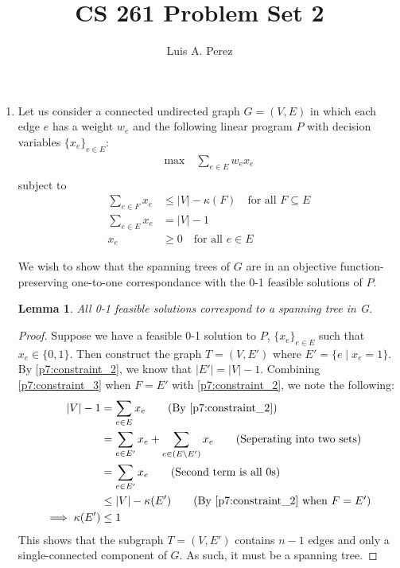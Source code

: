 \documentclass[12pt]{exam}
\newtheorem{lemma}[theorem]{Lemma}
\newcommand*{\authorname}{Luis A. Perez}
\newcommand{\Q}[1]{\question{\large{\textbf{#1}}}}
\begin{document}
\title{CS 261 Problem Set 2}
\author{\authorname}
\date{}
\maketitle
\thispagestyle{headandfoot}
\setcounter{MaxMatrixCols}{15}

\begin{questions}
\Q{Problem 7}
\begin{solution}
  \begin{enumerate}[label=(\alph*)]
    \item
      Let us consider a connected undirected graph $G= (V,E)$ in which each edge $e$ has a weight $w_e$ and the following linear program $P$ with decision variables $\{ x_e \}_{e \in E}$:
        \begin{align}
          \text{max} \quad \sum_{e \in E} w_e x_e \label{p7:obj} \\
        \end{align}
        subject to
        \begin{align}
          \sum_{e \in F} x_e &\leq |V| - \kappa(F) \quad \text{for all } F \subseteq E \label{p7:constraint_1} \\
          \sum_{e \in E} x_e &= |V| -1 \label{p7:constraint_2} \\
          x_e &\geq 0 \quad \text{for all } e \in E \label{p7:constraint_3}
        \end{align}


      We wish to show that the spanning trees of $G$ are in an objective function-preserving one-to-one correspondance with the 0-1 feasible solutions of $P$.

      \begin{lemma}
      All 0-1 feasible solutions correspond to a spanning tree in G.
      \end{lemma}
      \begin{proof}
        Suppose we have a feasible 0-1 solution to $P$, $\{x_e\}_{e \in E}$ such that $x_e \in \{0, 1\}$. Then construct the graph $T = (V,E')$ where $E' = \{ e \mid  x_e = 1 \}$. By \ref{p7:constraint_2}, we know that $|E'| = |V| - 1$. Combining \ref{p7:constraint_3} when $F = E'$ with \ref{p7:constraint_2}, we note the following:
        \begin{align*}
          |V| - 1 &= \sum_{e \in E} x_e \tag{By \ref{p7:constraint_2}} \\
          &= \sum_{e \in E'} x_e + \sum_{e \in (E \setminus E')} x_e \tag{Seperating into two sets} \\
          &= \sum_{e \in E'} x_e \tag{Second term is all $0$s} \\
          &\leq |V| -  \kappa(E') \tag{By \ref{p7:constraint_2} when $F = E'$} \\
          \implies \kappa(E') &\leq 1
        \end{align*}
        This shows that the subgraph $T = (V, E')$ contains $n-1$ edges and only a single-connected component of $G$. As such, it must be a spanning tree.
      \end{proof}


\end{enumerate}
\end{solution}
\end{questions}
\end{document}
